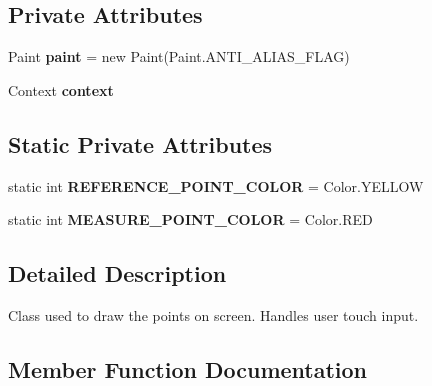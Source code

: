 \subsection*{Private Attributes}
\begin{DoxyCompactItemize}
\item 
\mbox{\label{classgroup10_1_1_draw_view_a931ab94ed7afbb4a27797ac28886d87e}} 
Paint {\bfseries paint} = new Paint(Paint.\+A\+N\+T\+I\+\_\+\+A\+L\+I\+A\+S\+\_\+\+F\+L\+AG)
\item 
\mbox{\label{classgroup10_1_1_draw_view_a55e7d46e3243db688169ac91ff52a1e0}} 
Context {\bfseries context}
\end{DoxyCompactItemize}
\subsection*{Static Private Attributes}
\begin{DoxyCompactItemize}
\item 
\mbox{\label{classgroup10_1_1_draw_view_a4bca35b2dbdd6e5522a661c8ac4533b0}} 
static int {\bfseries R\+E\+F\+E\+R\+E\+N\+C\+E\+\_\+\+P\+O\+I\+N\+T\+\_\+\+C\+O\+L\+OR} = Color.\+Y\+E\+L\+L\+OW
\item 
\mbox{\label{classgroup10_1_1_draw_view_a2e1893b4a1f608e891cf9b5b9d1a853b}} 
static int {\bfseries M\+E\+A\+S\+U\+R\+E\+\_\+\+P\+O\+I\+N\+T\+\_\+\+C\+O\+L\+OR} = Color.\+R\+ED
\end{DoxyCompactItemize}


\subsection{Detailed Description}
Class used to draw the points on screen. Handles user touch input. 

\subsection{Member Function Documentation}
\mbox{\label{classgroup10_1_1_draw_view_a545ae5eccd5abcfeb8d2c7286ca6c0e7}} 
